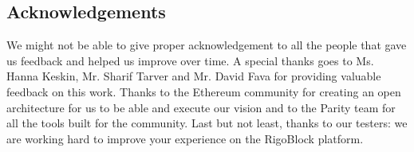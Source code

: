 \documentclass[9pt,oneside]{amsart}
\begin{document}
\begin{multicols}{2}
\section{Acknowledgements}
We might not be able to give proper acknowledgement to all the people that gave us feedback and helped us improve over time. A special thanks goes to Ms. Hanna Keskin, Mr. Sharif Tarver and Mr. David Fava for providing valuable feedback on this work. Thanks to the Ethereum community for creating an open architecture for us to be able and execute our vision and to the Parity team for all the tools built for the community. Last but not least, thanks to our testers: we are working hard to improve your experience on the RigoBlock platform.




\end{multicols}
\end{document}
